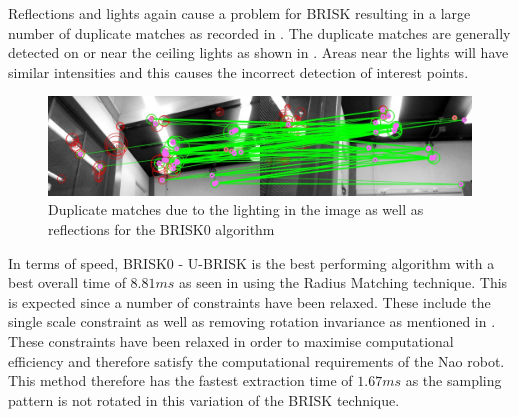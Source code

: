 Reflections and lights again cause a problem for BRISK resulting in a large number of duplicate matches as recorded in . The duplicate matches are generally detected on or near the ceiling lights as shown in . Areas near the lights will have similar intensities and this causes the incorrect detection of interest points.\\

\begin{figure}
  \centering
    \includegraphics[width=1.0\textwidth]{../Drawings/problems/Reflections.jpg}
    \caption{Duplicate matches due to the lighting in the image as well as reflections for the BRISK0 algorithm} 
    \label{fig:duplicateMatchesBrisk}
\end{figure}



In terms of speed, BRISK0 - U-BRISK is the best performing algorithm with a best overall time of $8.81 ms$ as seen in  using the Radius Matching technique.  This is expected since a number of constraints have been relaxed. These include the single scale constraint as well as removing rotation invariance as mentioned in . These constraints have been relaxed in order to maximise computational efficiency and therefore satisfy the computational requirements of the Nao robot. This method therefore has the fastest extraction time of $1.67 ms$ as the sampling pattern is not rotated in this variation of the BRISK technique. \\

